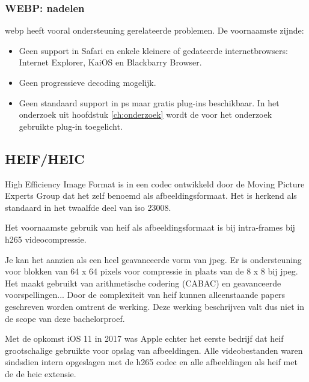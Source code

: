 \subsubsection{WEBP: nadelen}
\label{sec:afbeeldingscompressie-webp-nadelen}

\Gls{webp} heeft vooral ondersteuning gerelateerde problemen. De voornaamste zijnde:

\begin{itemize}
	\item Geen support in Safari en enkele kleinere of gedateerde internetbrowsers: Internet Explorer, KaiOS en Blackbarry Browser.
	
	\item Geen progressieve \gls{decoding} mogelijk.
	
	\item Geen standaard support in \gls{ps} maar gratis \glspl{plug-in} beschikbaar. In het onderzoek uit hoofdstuk \ref{ch:onderzoek} wordt de voor het onderzoek gebruikte \gls{plug-in} toegelicht.
\end{itemize}

\subsection{HEIF/HEIC}
\label{sec:afbeeldingscompressie-heif}

High Efficiency Image Format is in een \gls{codec} ontwikkeld door de Moving Picture Experts Group dat het zelf benoemd als \gls{afbeeldingsformaat}. Het is herkend als standaard in het twaalfde deel van \gls{iso} 23008.

Het voornaamste gebruik van \gls{heif} als \gls{afbeeldingsformaat} is bij \glspl{intra-frame} bij \gls{h265} \gls{videocompressie}.

Je kan het aanzien als een heel geavanceerde vorm van \gls{jpeg}. Er is ondersteuning voor blokken van 64 x 64 \glspl{pixel} voor compressie in plaats van de 8 x 8 bij \gls{jpeg}. Het maakt gebruikt van arithmetische codering (CABAC) en geavanceerde voorspellingen... Door de complexiteit van \gls{heif} kunnen alleenstaande papers geschreven worden omtrent de werking. Deze werking beschrijven valt dus niet in de scope van deze bachelorproef.

Met de opkomst iOS 11 in 2017 was Apple echter het eerste bedrijf dat \gls{heif} grootschalige gebruikte voor opslag van afbeeldingen. Alle videobestanden waren sindsdien intern opgeslagen met de \gls{h265} \gls{codec} en alle afbeeldingen als \gls{heif} met de de \gls{heic} \gls{extensie}. 

